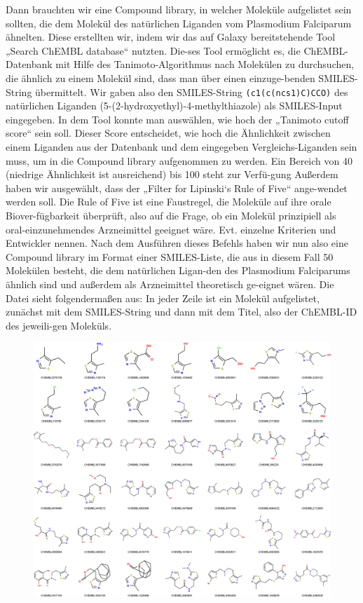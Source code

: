 \documentclass[11pt]{article}
\begin{document}
{    Dann brauchten wir eine Compound library, in welcher Moleküle aufgelistet sein sollten, die dem Molekül des natürlichen Liganden vom Plasmodium Falciparum ähnelten. Diese erstellten wir, indem wir das auf Galaxy bereitstehende Tool „Search ChEMBL database“ nutzten. Die-ses Tool ermöglicht es, die ChEMBL-Datenbank mit Hilfe des Tanimoto-Algorithmus nach Molekülen zu durchsuchen, die ähnlich zu einem Molekül sind, dass man über einen einzuge-benden SMILES-String übermittelt. Wir gaben also den SMILES-String \texttt{(c1(c(ncs1)C)CCO)} des natürlichen Liganden (5-(2-hydroxyethyl)-4-methylthiazole) als SMILES-Input eingegeben.
    In dem Tool konnte man auswählen, wie hoch der „Tanimoto cutoff score“ sein soll. Dieser Score entscheidet, wie hoch die Ähnlichkeit zwischen einem Liganden aus der Datenbank und dem eingegeben Vergleichs-Liganden sein muss, um in die Compound library aufgenommen zu werden. Ein Bereich von 40 (niedrige Ähnlichkeit ist ausreichend) bis 100 steht zur Verfü-gung Außerdem haben wir ausgewählt, dass der „Filter for Lipinski‘s Rule of Five“ ange-wendet werden soll. Die Rule of Five ist eine Faustregel, die Moleküle auf ihre orale Biover-fügbarkeit überprüft, also auf die Frage, ob ein Molekül prinzipiell als oral-einzunehmendes Arzneimittel geeignet wäre.
    Evt. einzelne Kriterien und Entwickler nennen.
    Nach dem Ausführen dieses Befehls haben wir nun also eine Compound library im Format einer SMILES-Liste, die aus in diesem Fall 50 Molekülen besteht, die dem natürlichen Ligan-den des Plasmodium Falciparums ähnlich sind und außerdem als Arzneimittel theoretisch ge-eignet wären. Die Datei sieht folgendermaßen aus: In jeder Zeile ist ein Molekül aufgelistet, zunächst mit dem SMILES-String und dann mit dem Titel, also der ChEMBL-ID des jeweili-gen Moleküls.
        \begin{figure}
            \includegraphics[width=\textwidth]{P. Falciparum - ligands - visual}
        \end{figure}

}
\end{document}
